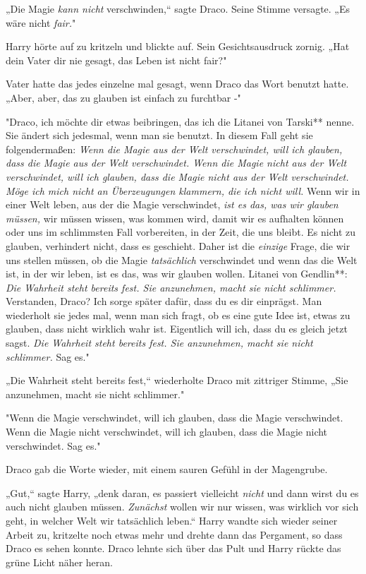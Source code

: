 {„Die Magie \emph{kann nicht} verschwinden,“ sagte Draco. Seine Stimme versagte. „Es wäre nicht \emph{fair.}"

Harry hörte auf zu kritzeln und blickte auf. Sein Gesichtsausdruck zornig. „Hat dein Vater dir nie gesagt, das Leben ist nicht fair?"

Vater hatte das jedes einzelne mal gesagt, wenn Draco das Wort benutzt hatte. „Aber, aber, das zu glauben ist einfach zu furchtbar -"

"Draco, ich möchte dir etwas beibringen, das ich die Litanei von Tarski** nenne. Sie ändert sich jedesmal, wenn man sie benutzt. In diesem Fall geht sie folgendermaßen: \emph{Wenn die Magie aus der Welt verschwindet, will ich glauben, dass die Magie aus der Welt verschwindet. Wenn die Magie nicht aus der Welt verschwindet, will ich glauben, dass die Magie nicht aus der Welt verschwindet. Möge ich mich nicht an Überzeugungen klammern, die ich nicht will.} Wenn wir in einer Welt leben, aus der die Magie verschwindet, \emph{ist es das, was wir glauben müssen,} wir müssen wissen, was kommen wird, damit wir es aufhalten können oder uns im schlimmsten Fall vorbereiten, in der Zeit, die uns bleibt. Es nicht zu glauben, verhindert nicht, dass es geschieht. Daher ist die \emph{einzige} Frage, die wir uns stellen müssen, ob die Magie \emph{tatsächlich} verschwindet und wenn das die Welt ist, in der wir leben, ist es das, was wir glauben wollen. Litanei von Gendlin**: \emph{Die Wahrheit steht bereits fest. Sie anzunehmen, macht sie nicht schlimmer.} Verstanden, Draco? Ich sorge später dafür, dass du es dir einprägst. Man wiederholt sie jedes mal, wenn man sich fragt, ob es eine gute Idee ist, etwas zu glauben, dass nicht wirklich wahr ist. Eigentlich will ich, dass du es gleich jetzt sagst. \emph{Die Wahrheit steht bereits fest. Sie anzunehmen, macht sie nicht schlimmer.} Sag es."

„Die Wahrheit steht bereits fest,“ wiederholte Draco mit zittriger Stimme, „Sie anzunehmen, macht sie nicht schlimmer."

"Wenn die Magie verschwindet, will ich glauben, dass die Magie verschwindet. Wenn die Magie nicht verschwindet, will ich glauben, dass die Magie nicht verschwindet. Sag es."

Draco gab die Worte wieder, mit einem sauren Gefühl in der Magengrube.

„Gut,“ sagte Harry, „denk daran, es passiert vielleicht \emph{nicht} und dann wirst du es auch nicht glauben müssen. \emph{Zunächst} wollen wir nur wissen, was wirklich vor sich geht, in welcher Welt wir tatsächlich leben.“ Harry wandte sich wieder seiner Arbeit zu, kritzelte noch etwas mehr und drehte dann das Pergament, so dass Draco es sehen konnte. Draco lehnte sich über das Pult und Harry rückte das grüne Licht näher heran.

}
